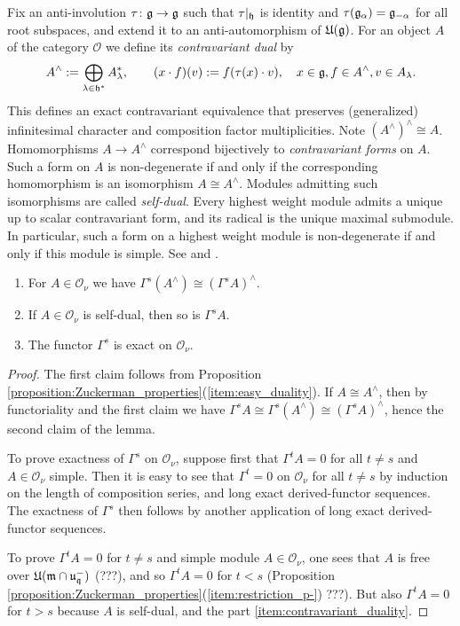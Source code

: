 \documentclass[a4paper,10pt]{article}
\begin{document}
Fix an anti-involution $\tau \colon \mathfrak{g \to g}$ such that $\tau |_{\mathfrak{h}}$ is identity and $\tau(\mathfrak{g}_\alpha) = \mathfrak{g}_{-\alpha}$ for all root subspaces, and extend it to an anti-automorphism of $\mathfrak{U(g)}$. For an object $A$ of the category $\mathcal{O}$ we define its \emph{contravariant dual} by
%
\[ A^\wedge := \bigoplus_{\lambda \in \mathfrak{h}^\ast} A_\lambda^\ast, \qquad (x \cdot f)(v) := f(\tau(x) \cdot v), \quad x \in \mathfrak{g}, f \in A^\wedge, v \in A_\lambda.\]
%
This defines an exact contravariant equivalence that preserves (generalized) infinitesimal character and composition factor multiplicities. Note $(A^\wedge)^\wedge \cong A$. Homomorphisms $A \to A^\wedge$ correspond bijectively to \emph{contravariant forms} on $A$. Such a form on $A$ is non-degenerate if and only if the corresponding homomorphism is an isomorphism $A \cong A^\wedge$. Modules admitting such isomorphisms are called \emph{self-dual}. Every highest weight module admits a unique up to scalar contravariant form, and its radical is the unique maximal submodule. In particular, such a form on a highest weight module is non-degenerate if and only if this module is simple. See \cite[3.2. and 3.14.]{hum} and \cite{irv}.

\begin{lemma}
\label{lemma:Gamma_duality}
\begin{enumerate}
\item \label{item:contravariant_duality} For $A \in \mathcal{O}_\nu$ we have $\Gamma^s (A^\wedge) \cong (\Gamma^s A)^\wedge$.

\item If $A \in \mathcal{O}_\nu$ is self-dual, then so is $\Gamma^s A$.

\item The functor $\Gamma^s$ is exact on $\mathcal{O}_\nu$.
\end{enumerate}
\end{lemma}
%
\begin{proof}
The first claim  follows from Proposition \ref{proposition:Zuckerman_properties}(\ref{item:easy_duality}). If $A \cong A^\wedge$, then by functoriality and the first claim we have $\Gamma^s A \cong \Gamma^s(A^\wedge) \cong (\Gamma^sA)^\wedge$, hence the second claim of the lemma.

To prove exactness of $\Gamma^s$ on $\mathcal{O}_\nu$, suppose first that $\Gamma^t A=0$ for all $t \neq s$ and $A \in \mathcal{O}_\nu$ simple. Then it is easy to see that $\Gamma^t =0$ on $\mathcal{O}_\nu$ for all $t \neq s$ by induction on the length of composition series, and long exact derived-functor sequences. The exactness of $\Gamma^s$ then follows by another application of long exact derived-functor sequences.


To prove $\Gamma^t A=0$ for $t \neq s$ and simple module $A \in \mathcal{O}_\nu$, one sees that $A$ is free over $\mathfrak{U(m \cap u_q^-)}$ (???), and so $\Gamma^t A=0$ for $t<s$ (Proposition \ref{proposition:Zuckerman_properties}(\ref{item:restriction_p-}) ???). But also $\Gamma^t A=0$ for $t>s$ because $A$ is self-dual, and the part \ref{item:contravariant_duality}.
\end{proof}
\end{document}
